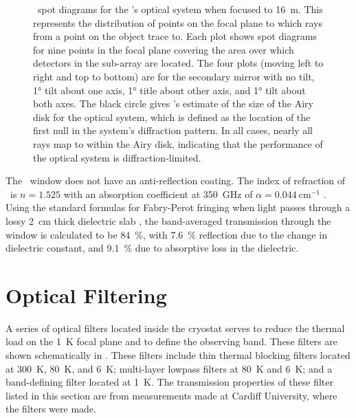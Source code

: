 \begin{figure}
\begin{tabular}{lr}
\end{tabular}
\caption[\ZEMAX\ spot diagrams]{
\ZEMAX\ spot diagrams for the \Imager's optical system when focused to \SI{16}{\m}.
This represents the distribution of points on the focal plane to which rays from a point on the object trace to.
Each plot shows spot diagrams for nine points in the focal plane covering the area over which detectors in the sub-array are located.
The four plots (moving left to right and top to bottom) are for the secondary mirror with no tilt, \ang{1} tilt about one axis, \ang{1} title about other axis, and \ang{1} tilt about both axes.
The black circle gives \ZEMAX's estimate of the size of the Airy disk for the optical system, which is defined as the location of the first null in the system's diffraction pattern.
In all cases, nearly all rays map to within the Airy disk, indicating that the performance of the optical system is diffraction-limited.
}
\label{fig:ch4-spot-diagrams}
\end{figure}

The \HDPE\ window does not have an anti-reflection coating.
The index of refraction of \HDPE\ is $n=1.525$ with an absorption coefficient at \SI{350}{\GHz} of $\alpha = \SI{0.044}{\cm^{-1}}$ \cite{lamb_miscellaneous_1996}.
Using the standard formulas for Fabry-Perot fringing when light passes through a lossy \SI{2}{\cm} thick dielectric slab \cite[Chapter~5]{sophocles_j._ordanidis_electromagnetic_2014}, the band-averaged transmission through the window is calculated to be \SI{84}{\percent}, with \SI{7.6}{\percent} reflection due to the change in dielectric constant, and \SI{9.1}{\percent} due to absorptive loss in the dielectric.

\section{Optical Filtering} \label{sec:ch4-filters}

A series of optical filters located inside the cryostat serves to reduce the thermal load on the \SI{1}{\K} focal plane and to define the observing band.
These filters are shown schematically in .
These filters include thin thermal blocking filters located at \SI{300}{\K}, \SI{80}{\K}, and \SI{6}{\K}; multi-layer lowpass filters at \SI{80}{\K} and \SI{6}{\K}; and a band-defining filter located at \SI{1}{\K}.
The transmission properties of these filter listed in this section are from measurements made at Cardiff University, where the filters were made.

